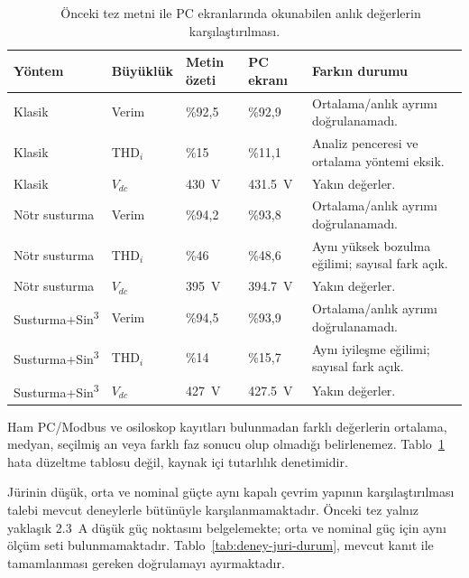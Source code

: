 \begin{table}[htbp]
  \centering
  \caption{\eskitezetiketi\ \juriistegietiketi\ Önceki tez metni ile PC ekranlarında okunabilen anlık değerlerin karşılaştırılması.}
  \label{tab:deney-metin-ekran-karsilastirma}
  \footnotesize
  \begin{tabularx}{\textwidth}{p{} p{} >{\centering\arraybackslash}X >{\centering\arraybackslash}X X}
    \toprule
    Yöntem & Büyüklük & Metin özeti & PC ekranı & Farkın durumu \\
    \midrule
    Klasik & Verim & \%92,5 & \%92,9 & Ortalama/anlık ayrımı doğrulanamadı. \\
    Klasik & THD$_i$ & \%15 & \%11,1 & Analiz penceresi ve ortalama yöntemi eksik. \\
    Klasik & $V_{dc}$ & \SI{430}{\volt} & \SI{431.5}{\volt} & Yakın değerler. \\
    \midrule
    Nötr susturma & Verim & \%94,2 & \%93,8 & Ortalama/anlık ayrımı doğrulanamadı. \\
    Nötr susturma & THD$_i$ & \%46 & \%48,6 & Aynı yüksek bozulma eğilimi; sayısal fark açık. \\
    Nötr susturma & $V_{dc}$ & \SI{395}{\volt} & \SI{394.7}{\volt} & Yakın değerler. \\
    \midrule
    Susturma+Sin\textsuperscript{3} & Verim & \%94,5 & \%93,9 & Ortalama/anlık ayrımı doğrulanamadı. \\
    Susturma+Sin\textsuperscript{3} & THD$_i$ & \%14 & \%15,7 & Aynı iyileşme eğilimi; sayısal fark açık. \\
    Susturma+Sin\textsuperscript{3} & $V_{dc}$ & \SI{427}{\volt} & \SI{427.5}{\volt} & Yakın değerler. \\
    \bottomrule
  \end{tabularx}
\end{table}

Ham PC/Modbus ve osiloskop kayıtları bulunmadan farklı değerlerin ortalama, medyan, seçilmiş an veya farklı faz sonucu olup olmadığı belirlenemez. Tablo~\ref{tab:deney-metin-ekran-karsilastirma} hata düzeltme tablosu değil, kaynak içi tutarlılık denetimidir.

Jürinin düşük, orta ve nominal güçte aynı kapalı çevrim yapının karşılaştırılması talebi mevcut deneylerle bütünüyle karşılanmamaktadır. Önceki tez yalnız yaklaşık \SI{2.3}{\ampere} düşük güç noktasını belgelemekte; orta ve nominal güç için aynı ölçüm seti bulunmamaktadır. Tablo~\ref{tab:deney-juri-durum}, mevcut kanıt ile tamamlanması gereken doğrulamayı ayırmaktadır.

